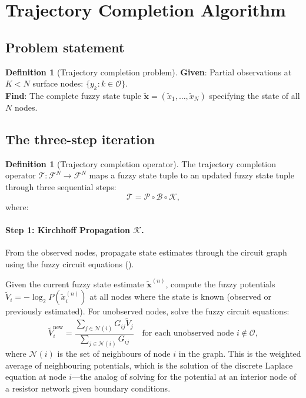 \documentclass[twocolumn,10pt,a4paper]{article}
\theoremstyle{definition}
\newtheorem{definition}[theorem]{Definition}
\theoremstyle{remark}
\newcommand{\Fcal}{\mathcal{F}}
\newcommand{\Tcal}{\mathcal{T}}
\newcommand{\Pcal}{\mathcal{P}}
\newcommand{\vect}[1]{\boldsymbol{#1}}
\newcommand{\fuzzy}[1]{\widetilde{#1}}
\begin{document}
\section{Trajectory Completion Algorithm}\label{sec:completion}

\subsection{Problem statement}

\begin{definition}[Trajectory completion problem]\label{def:completion_problem}
\textbf{Given}: Partial observations at $K < N$ surface nodes: $\{y_k : k \in \mathcal{O}\}$.\\
\textbf{Find}: The complete fuzzy state tuple $\fuzzy{\vect{x}} = (\fuzzy{x}_1, \ldots, \fuzzy{x}_N)$ specifying the state of all $N$ nodes.
\end{definition}

\subsection{The three-step iteration}

\begin{definition}[Trajectory completion operator]\label{def:completion_operator}
The trajectory completion operator $\Tcal : \Fcal^N \to \Fcal^N$ maps a fuzzy state tuple to an updated fuzzy state tuple through three sequential steps:
\begin{equation}\label{eq:completion_operator}
\Tcal = \Pcal \circ \mathcal{B} \circ \mathcal{K},
\end{equation}
where:
\end{definition}

\paragraph{Step 1: Kirchhoff Propagation $\mathcal{K}$.}

From the observed nodes, propagate state estimates through the circuit graph using the fuzzy circuit equations ().

Given the current fuzzy state estimate $\fuzzy{\vect{x}}^{(n)}$, compute the fuzzy potentials $\fuzzy{V}_i = -\log_2 P(\fuzzy{x}_i^{(n)})$ at all nodes where the state is known (observed or previously estimated). For unobserved nodes, solve the fuzzy circuit equations:
\begin{equation}\label{eq:kirchhoff_step}
\fuzzy{V}_i^{\mathrm{new}} = \frac{\sum_{j \in \mathcal{N}(i)} G_{ij} \fuzzy{V}_j}{\sum_{j \in \mathcal{N}(i)} G_{ij}} \quad \text{for each unobserved node } i \notin \mathcal{O},
\end{equation}
where $\mathcal{N}(i)$ is the set of neighbours of node $i$ in the graph. This is the weighted average of neighbouring potentials, which is the solution of the discrete Laplace equation at node $i$---the analog of solving for the potential at an interior node of a resistor network given boundary conditions.
\end{document}
